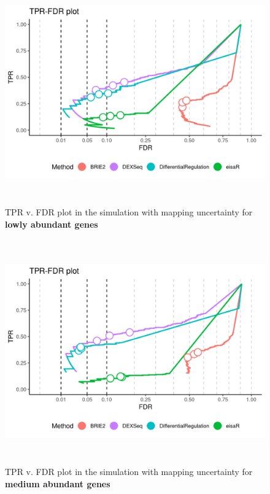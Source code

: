 \begin{figure}[!htb]
\begin{center}
\includegraphics[width=6in,height=3.8in]{../figures/simulation/minnow_simulation_low_FDR.png}
\end{center}
\caption{TPR v. FDR plot in the simulation with mapping uncertainty for \textbf{lowly abundant genes}}
\label{fig:soph_sim_FDR_low}
\end{figure}

\begin{figure}[!htb]
\begin{center}
\includegraphics[width=6in,height=3.8in]{../figures/simulation/minnow_simulation_mod_FDR.png}
\end{center}
\caption{TPR v. FDR plot in the simulation with mapping uncertainty for \textbf{medium abundant genes}}
\label{fig:soph_sim_FDR_mod}
\end{figure}


